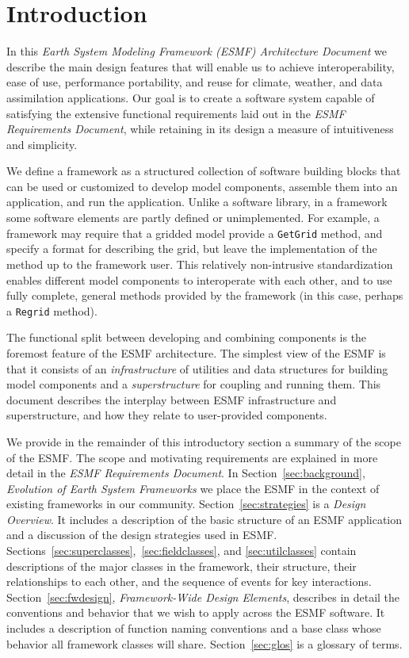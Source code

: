\section{Introduction}

In this {\it Earth System Modeling Framework (ESMF) Architecture Document} we describe 
the main design features that will enable us to achieve interoperability, ease of 
use, performance portability, and reuse for climate, weather, and data assimilation
applications.  Our goal is to create a software system capable of satisfying
the extensive functional requirements laid out in the {\it ESMF 
Requirements Document}, while retaining in its design a measure of intuitiveness
and simplicity. 

We define a framework as a structured collection of software building blocks 
that can be used or customized to develop model components, assemble them into an 
application, and run the application.  Unlike a software library, in a framework some
software elements are partly defined or unimplemented.  For example, a framework
may require that a gridded model provide a {\tt GetGrid} method, and specify 
a format for describing the grid, but leave the implementation of the method up
to the framework user.  This relatively non-intrusive standardization enables 
different model components to interoperate with each other, and to use fully
complete, general methods provided by the framework (in this case, perhaps a 
{\tt Regrid} method).

The functional split between developing and combining components is the
foremost feature of the ESMF architecture.  The simplest view of the ESMF 
is that it consists of an {\it infrastructure} of utilities and data 
structures for building model components and a {\it superstructure} for coupling 
and running them.  This document describes the interplay between ESMF 
infrastructure and superstructure, and how they relate to user-provided components.

We provide in the remainder of this introductory section a summary of the 
scope of the ESMF.  The scope and motivating requirements are explained in more detail in the {\it ESMF Requirements Document}.  In Section~\ref{sec:background}, {\it Evolution of Earth System Frameworks} we place the ESMF in the context of existing frameworks in our community.  Section~\ref{sec:strategies} is 
a {\it Design Overview}.  It includes 
a description of the basic structure of an ESMF application and a discussion of 
the design strategies
used in ESMF.  Sections~\ref{sec:superclasses},~\ref{sec:fieldclasses}, and
\ref{sec:utilclasses} contain descriptions of the 
major classes in the framework, their structure, their relationships to each other, 
and the sequence of events for key interactions.  Section~\ref{sec:fwdesign}, {\it 
Framework-Wide Design Elements}, describes in detail the conventions and behavior
that we wish to apply across the ESMF software.  It
includes a description of function naming conventions and a base class whose behavior all 
framework classes will share.  Section~\ref{sec:glos} is a glossary of terms.








